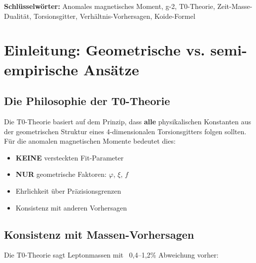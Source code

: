 	\textbf{Schlüsselwörter:} Anomales magnetisches Moment, g-2, T0-Theorie, Zeit-Masse-Dualität, Torsionsgitter, Verhältnis-Vorhersagen, Koide-Formel
	
	
	\section{Einleitung: Geometrische vs. semi-empirische Ansätze}
	
	\subsection{Die Philosophie der T0-Theorie}
	
	Die T0-Theorie basiert auf dem Prinzip, dass \textbf{alle} physikalischen Konstanten aus der geometrischen Struktur eines 4-dimensionalen Torsionsgitters folgen sollten. Für die anomalen magnetischen Momente bedeutet dies:
	
	\begin{itemize}
		\item \textbf{KEINE} versteckten Fit-Parameter
		\item \textbf{NUR} geometrische Faktoren: $\varphi$, $\xi$, $f$
		\item Ehrlichkeit über Präzisionsgrenzen
		\item Konsistenz mit anderen Vorhersagen
	\end{itemize}
	
	\subsection{Konsistenz mit Massen-Vorhersagen}
	
	Die T0-Theorie sagt Leptonmassen mit ~0{,}4--1{,}2\% Abweichung vorher:
	
	\begin{table}[h]
		\centering
		\caption{Leptonmassen in T0}
	\end{table}
	

